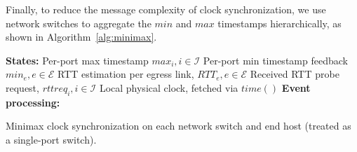 Finally, to reduce the message complexity of clock synchronization, we use network switches to aggregate the $min$ and $max$ timestamps hierarchically, as shown in Algorithm~\ref{alg:minimax}.
\fi

\setlength{\textfloatsep}{0em}
\begin{algorithm}[t]
 \DontPrintSemicolon
 \textbf{States:} Per-port max timestamp $max_i, i \in \mathcal{I}$\;
 	\qquad Per-port min timestamp feedback $min_e, e \in \mathcal{E}$\;
    \qquad RTT estimation per egress link, $RTT_e, e \in \mathcal{E}$\;
    \qquad Received RTT probe request, $rttreq_i, i \in \mathcal{I}$\;
 	\qquad Local physical clock, fetched via $time()$\;
 \textbf{Event processing:}\\
 \caption{Minimax clock synchronization on each network switch and end host (treated as a single-port switch).}
 \label{alg:minimax}
\end{algorithm}





